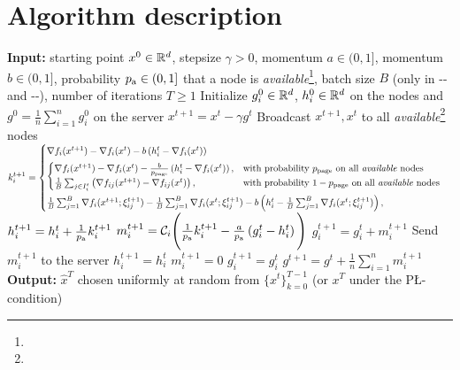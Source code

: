 \documentclass{article}
\begin{document}
\section{Algorithm description}
\begin{algorithm}[h!]
  \caption{-}
  \label{alg:main_algorithm}
  \begin{algorithmic}[1]
  \STATE \textbf{Input:} starting point $x^0 \in \mathbb{R}^d$, stepsize $\gamma > 0$, momentum $a \in (0, 1]$, 
  momentum $b \in (0, 1]$, probability $p_{\textnormal{a}} \in (0, 1]$ that a node is \textit{available}\footnote{}, 
  batch size $B$ (only in -- and --), 
  number of iterations $T \geq 1$
  \STATE Initialize $g^0_i\in \mathbb{R}^d$, $h^0_i\in \mathbb{R}^d$ on the nodes and  $g^0 = \frac{1}{n}\sum_{i=1}^n g^0_i$ on the server
  \STATE $x^{t+1} = x^t - \gamma g^t$
  \STATE Broadcast $x^{t+1}, x^{t}$ to all \textit{available}\footnote{} nodes
      \STATE $k^{t+1}_i = 
      \begin{cases}
          \vspace{0.15cm}
          \nabla f_i(x^{t+1}) - \nabla f_i(x^{t}) - b \left(h^t_i - \nabla f_i(x^{t})\right) \\
          \vspace{0.15cm}
          \begin{cases}
              \nabla f_i(x^{t+1}) - \nabla f_i(x^{t}) - \frac{b}{\probpage} \left(h^t_i - \nabla f_i(x^{t})\right),& \textnormal{with probability $\probpage$ on all \textit{available} nodes} \\
              \frac{1}{B}\sum_{j \in I^t_i}\left(\nabla f_{ij}(x^{t+1}) - \nabla f_{ij}(x^{t})\right), & \textnormal{with probability $1 - \probpage$ on all \textit{available} nodes} 
          \end{cases}  \\
          \frac{1}{B}\sum_{j=1}^B \nabla f_i(x^{t+1};\xi^{t+1}_{ij}) - \frac{1}{B}\sum_{j=1}^B \nabla f_i(x^{t};\xi^{t+1}_{ij}) - b \left(h^t_i - \frac{1}{B}\sum_{j=1}^B \nabla f_i(x^{t};\xi^{t+1}_{ij})\right),
      \end{cases}$
      \STATE $h^{t+1}_i = h^t_i + \frac{1}{p_{\textnormal{a}}}k^{t+1}_i$ 
      \STATE $m^{t+1}_i = \mathcal{C}_i\Bigg(\frac{1}{p_{\textnormal{a}}}k^{t+1}_i - \frac{a}{p_{\textnormal{a}}} \left(g^{t}_i - h^{t}_i\right)\Bigg)$
      \STATE $g^{t+1}_i = g^{t}_i + m^{t+1}_i$
      \STATE Send $m^{t+1}_i$ to the server
  \ELSE
      \STATE $h^{t+1}_i = h^{t}_i$
      \STATE $m^{t+1}_i = 0$
      \STATE $g^{t+1}_i = g^{t}_i$
  \ENDIF
  \ENDFOR
  \STATE $g^{t+1} = g^t + \frac{1}{n} \sum_{i=1}^n m^{t+1}_i$
  \ENDFOR
  \STATE \textbf{Output:} $\hat{x}^T$ chosen uniformly at random from $\{x^t\}_{k=0}^{T-1}$ (or $x^T$ under the P\L-condition)
  \end{algorithmic}
\end{algorithm}
\end{document}
